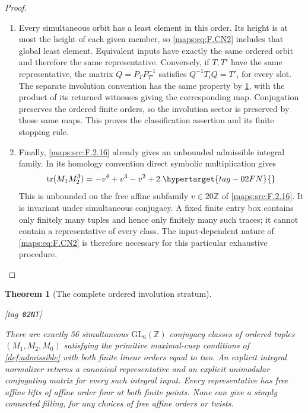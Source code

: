 \documentclass[11pt,a4paper]{article}
\numberwithin{equation}{section}
\newtheorem{theorem}{Theorem}[section]
\theoremstyle{definition}
\newcommand{\StatementRecord}[4]{{\upshape\footnotesize[tag~\texttt{#3}]}\enspace\ignorespaces}
\begin{document}
\begin{proof}
\begin{enumerate}[label=\arabic*.]
\item Every simultaneous orbit has a least element in this order.
Its height is at most the height of each given member, so
\eqref{maps:eq:F.CN2} includes that global least element.
Equivalent inputs have exactly the same ordered orbit and
therefore the same representative. Conversely, if $T,T'$ have
the same representative, the matrix
$Q=P_TP_{T'}^{-1}$ satisfies $Q^{-1}T_iQ=T'_i$ for every slot.
The separate involution convention has the same property by
\cref{maps:src:F.2.38}, with the product of its returned
witnesses giving the corresponding map. Conjugation preserves
the ordered finite orders, so the involution sector is preserved
by those same maps. This proves the classification assertion
and its finite stopping rule.

\item Finally, \ref{maps:src:F.2.16} already gives an unbounded admissible integral
family. In its homology convention direct symbolic
multiplication gives
\begin{equation}
             \operatorname{tr}(M_1M_2^3)
                       =-v^4+v^3-v^2+2.                 \hypertarget{tag-02FN}{}\label{maps:eq:F.CN3}
\end{equation}
This is unbounded on the free affine subfamily
$v\in20\mathbb Z$ of \cref{maps:src:F.2.16}. It is invariant under
simultaneous conjugacy. A fixed finite entry box contains
only finitely many tuples and hence only finitely many such
traces; it cannot contain a representative of every class.
The input-dependent nature of \eqref{maps:eq:F.CN2} is therefore necessary
for this particular exhaustive procedure.

\end{enumerate}
\end{proof}




\begin{theorem}[The complete ordered involution stratum]\hypertarget{tag-02NT}{}\label{maps:src:F.2.38}
\StatementRecord{maps:src:F.2.38}{proved}{02NT}{\eqref{maps:eq:F.IV1}, \eqref{maps:eq:F.IV3}, \eqref{maps:eq:F.IV4}, \eqref{maps:eq:F.IV2}, \cref{maps:src:F.2.31}}


There are exactly 56 simultaneous $\mathrm{GL}_6(\mathbb Z)$
conjugacy classes of ordered tuples $(M_1,M_2,M_0)$ satisfying
the primitive maximal-cusp conditions of \cref{def:admissible} with both finite linear orders equal to two.  An explicit integral normalizer
returns a canonical representative and an explicit unimodular
conjugating matrix for every such integral input.  Every representative has free affine lifts of
affine order four at both finite points.  None can give a
simply connected filling, for any choices of free affine
orders or twists.

\end{theorem}
\end{document}
